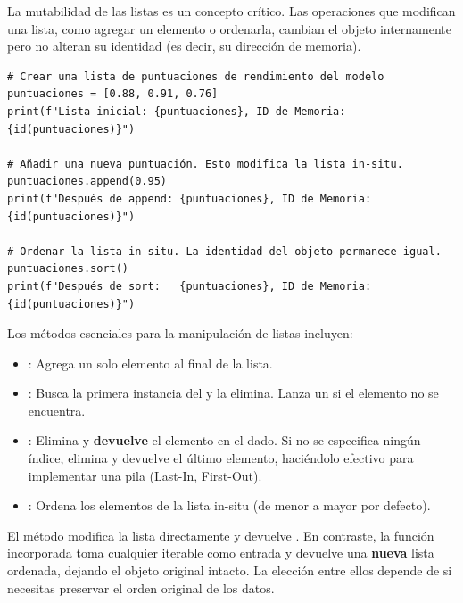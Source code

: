 La mutabilidad de las listas es un concepto crítico. Las operaciones que modifican una lista, como agregar un elemento o ordenarla, cambian el objeto internamente pero no alteran su identidad (es decir, su dirección de memoria).

\begin{example}
\text{ }\begin{verbatim}
# Crear una lista de puntuaciones de rendimiento del modelo
puntuaciones = [0.88, 0.91, 0.76]
print(f"Lista inicial: {puntuaciones}, ID de Memoria: {id(puntuaciones)}")

# Añadir una nueva puntuación. Esto modifica la lista in-situ.
puntuaciones.append(0.95)
print(f"Después de append: {puntuaciones}, ID de Memoria: {id(puntuaciones)}")

# Ordenar la lista in-situ. La identidad del objeto permanece igual.
puntuaciones.sort()
print(f"Después de sort:   {puntuaciones}, ID de Memoria: {id(puntuaciones)}")
\end{verbatim}
\end{example}

Los métodos esenciales para la manipulación de listas incluyen:
\begin{itemize}
    \item \textbf{}: Agrega un solo elemento al final de la lista.
    \item \textbf{}: Busca la primera instancia del  y la elimina. Lanza un  si el elemento no se encuentra.
    \item \textbf{}: Elimina y \textbf{devuelve} el elemento en el  dado. Si no se especifica ningún índice, elimina y devuelve el último elemento, haciéndolo efectivo para implementar una pila (Last-In, First-Out).
    \item \textbf{}: Ordena los elementos de la lista in-situ (de menor a mayor por defecto).
\end{itemize}

\begin{remark}
El método  modifica la lista directamente y devuelve . En contraste, la función incorporada  toma cualquier iterable como entrada y devuelve una \textbf{nueva} lista ordenada, dejando el objeto original intacto. La elección entre ellos depende de si necesitas preservar el orden original de los datos.
\end{remark}

